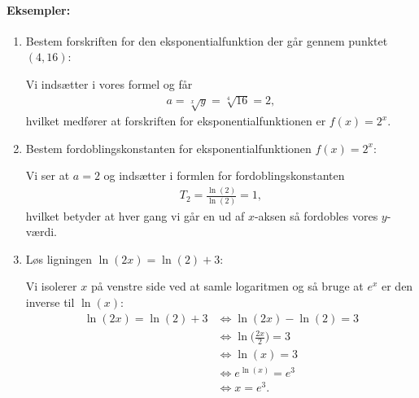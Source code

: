 \paragraph*{Eksempler:}
\begin{enumerate}
\item Bestem forskriften for den eksponentialfunktion der går gennem punktet $(4,16)$:

Vi indsætter i vores formel og får
\begin{align*}
a= \sqrt[x]{y} = \sqrt[4]{16} = 2,
\end{align*} 
hvilket medfører at forskriften for eksponentialfunktionen er $f(x)=2^x$.
\item Bestem fordoblingskonstanten for eksponentialfunktionen $f(x)=2^x$:

Vi ser at $a=2$ og indsætter i formlen for fordoblingskonstanten
\begin{align*}
T_2=\frac{\ln(2)}{\ln(2)}=1,
\end{align*}
hvilket betyder at hver gang vi går en ud af $x$-aksen så fordobles vores $y$-værdi.
\item Løs ligningen $\ln(2x)=\ln(2) +3$:

Vi isolerer $x$ på venstre side ved at samle logaritmen og så bruge at $e^x$ er den inverse til $\ln(x)$:
\begin{align*}
\ln(2x)=\ln(2) + 3 &\Leftrightarrow \ln(2x)-\ln(2)=3 \\
&\Leftrightarrow \ln\Big(\frac{2x}{2}\Big) = 3\\
&\Leftrightarrow \ln(x)=3 \\
&\Leftrightarrow e^{\ln(x)} = e^3 \\
&\Leftrightarrow x=e^3.
\end{align*}
\end{enumerate}







